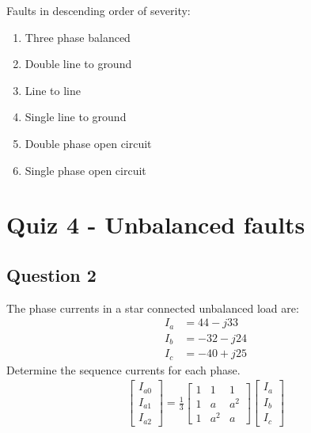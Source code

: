 Faults in descending order of severity:
\begin{enumerate}
    \item Three phase balanced
    \item Double line to ground
    \item Line to line
    \item Single line to ground
    \item Double phase open circuit
    \item Single phase open circuit
\end{enumerate}
\chapter{Quiz 4 - Unbalanced faults}
\section{Question 2}
The phase currents in a star connected unbalanced load are:
\begin{align}
    I_a &= 44-j33\\
    I_b &= -32-j24\\
    I_c &= -40+j25
\end{align}
Determine the sequence currents for each phase.
\begin{gather}
    \begin{bmatrix}
        I_{a0} \\
        I_{a1} \\
        I_{a2}
    \end{bmatrix} = \frac{1}{3}\begin{bmatrix}
        1 & 1   & 1   \\
        1 & a   & a^2   \\
        1 & a^2 & a
    \end{bmatrix}\begin{bmatrix}
        I_{a}\\
        I_{b}\\
        I_{c}
    \end{bmatrix}
\end{gather}
